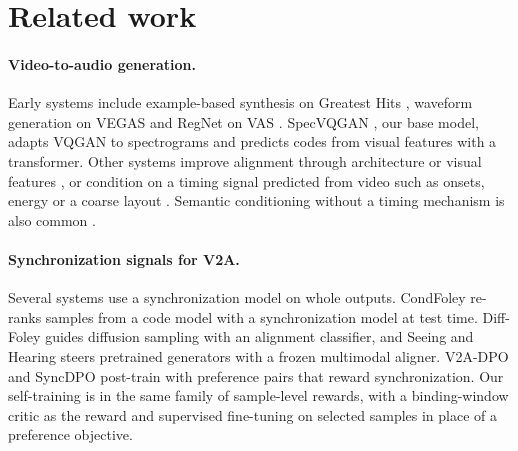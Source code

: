 \section{Related work}
\label{sec:related}

\paragraph{Video-to-audio generation.}
Early systems include example-based synthesis on Greatest Hits \citep{owens2016visually}, waveform generation on VEGAS \citep{zhou2018visual} and RegNet on VAS \citep{chen2020regnet}. SpecVQGAN \citep{iashin2021taming}, our base model, adapts VQGAN \citep{esser2021taming} to spectrograms and predicts codes from visual features with a transformer. Other systems improve alignment through architecture or visual features \citep{mei2024foleygen,wang2024frieren,viertola2025vaura,cheng2025mmaudio,mo2025foleyflow}, or condition on a timing signal predicted from video such as onsets, energy or a coarse layout \citep{comunita2024syncfusion,zhang2026foleycrafter,ton2025taro,jeong2025rewas,wang2024tiva}. Semantic conditioning without a timing mechanism is also common \citep{sheffer2023im2wav,wang2024v2amapper}.

\paragraph{Synchronization signals for V2A.}
Several systems use a synchronization model on whole outputs. CondFoley \citep{du2023conditional} re-ranks samples from a code model with a synchronization model at test time. Diff-Foley \citep{luo2023difffoley} guides diffusion sampling with an alignment classifier, and Seeing and Hearing \citep{xing2024seeing} steers pretrained generators with a frozen multimodal aligner. V2A-DPO \citep{chan2026v2adpo} and SyncDPO \citep{cheng2026syncdpo} post-train with preference pairs that reward synchronization. Our self-training is in the same family of sample-level rewards, with a binding-window critic as the reward and supervised fine-tuning on selected samples in place of a preference objective.

